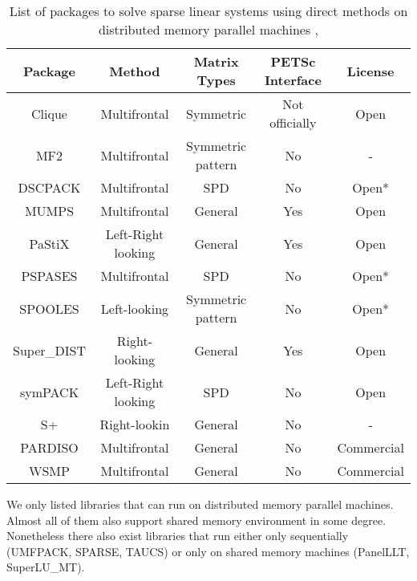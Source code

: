 \begin{table}[ht]
\centering
\begin{tabular}{|c|c|c|c|c|}
\hline
Package & Method             & Matrix Types                 & PETSc Interface & License      \\ \hline
Clique       & Multifrontal       & Symmetric      & Not officially  & Open  \\ \hline
MF2          & Multifrontal       & Symmetric pattern & No              & -            \\ \hline
DSCPACK      & Multifrontal       & SPD                          & No              & Open* \\ \hline
MUMPS        & Multifrontal       & General                      & Yes             & Open  \\ \hline
PaStiX       & Left-Right looking & General                      & Yes             & Open  \\ \hline
PSPASES      & Multifrontal       & SPD                          & No              & Open* \\ \hline
SPOOLES      & Left-looking       & Symmetric pattern & No              & Open* \\ \hline
Super\_DIST & Right-looking      & General                      & Yes             & Open  \\ \hline
symPACK      & Left-Right looking & SPD                          & No              & Open  \\ \hline
S+           & Right-lookin       & General                      & No              & -            \\ \hline

PARDISO         & Multifrontal       & General                      & No              & Commercial   \\ \hline

WSMP         & Multifrontal       & General                      & No              & Commercial   \\ \hline
\end{tabular}
\caption{List of packages to solve sparse linear systems using direct methods on distributed memory parallel machines \cite{list-of-sparse-direct-solvers}, \cite{petsc-web-page}}
\label{table:mm-library-spec}
\end{table}


We only listed libraries that can run on distributed memory parallel machines. Almost all of them also support shared memory environment in some degree. Nonetheless there also exist libraries that  run either only sequentially (UMFPACK, SPARSE, TAUCS) or only on shared memory machines (PanelLLT, SuperLU\_MT).\\


